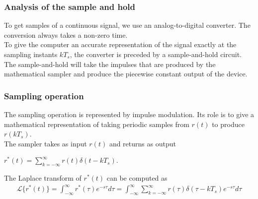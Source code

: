 \begin{frame}
	\frametitle{Analysis of the sample and hold}
	To get samples of a continuous signal, we use an analog-to-digital converter. The conversion always takes a non-zero time.\\
	\vspace{1em}
	To give the computer an accurate representation of the signal exactly at the sampling instants $kT_s$, the converter is preceded by a sample-and-hold circuit.\\
	\vspace{1em}
	The sample-and-hold will take the impulses that are produced by the mathematical sampler and produce the piecewise constant output of the device.
\end{frame}

\begin{frame}
	\frametitle{Sampling operation}
	\begin{block}{}
	The sampling operation is represented by impulse modulation. Its role is to give a mathematical representation of taking periodic samples from $r(t)$ to produce $r(kT_s)$. \\
	\vspace{1em}
	The sampler takes as input $r(t)$ and returns as output
	\begin{center}
	$r^*(t)=\sum_{k=-\infty}^{\infty} r(t)\delta(t-kT_s)$.
	\end{center}
	\vspace{1em}
	The Laplace transform of $r^*(t)$ can be computed as\\
	\vspace{-1.5em}
	\begin{align*} 
	\mathcal{L}\{r^*(t)\} = \int_{-\infty}^{\infty} r^*(\tau)e^{-s\tau} d\tau = \int_{-\infty}^{\infty} \sum_{k=-\infty}^{\infty} r(\tau)\delta(\tau-kT_s)e^{-s\tau}d\tau 
	\end{align*}\\
	\end{block}
\end{frame}

